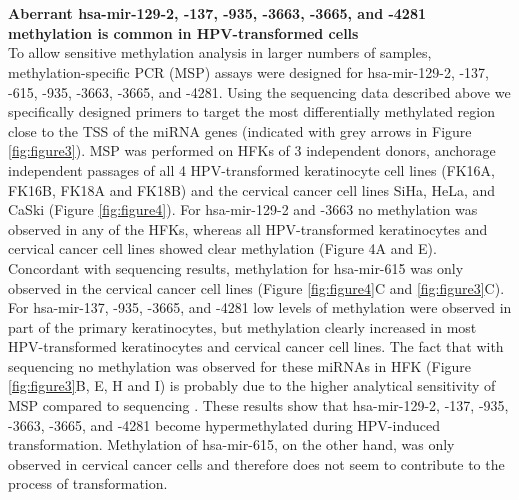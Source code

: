 \\
\\
\textbf{Aberrant hsa-mir-129-2, -137, -935, -3663, -3665, and -4281 methylation is common in HPV-transformed cells}
\\
To allow sensitive methylation analysis in larger numbers of samples, methylation-specific PCR (MSP) assays were designed for hsa-mir-129-2, -137, -615, -935, -3663, -3665, and -4281. Using the sequencing data described above we specifically designed primers to target the most differentially methylated region close to the TSS of the miRNA genes (indicated with grey arrows in Figure \ref{fig:figure3}). MSP was performed on HFKs of 3 independent donors, anchorage independent passages of all 4 HPV-transformed keratinocyte cell lines (FK16A, FK16B, FK18A and FK18B) and the cervical cancer cell lines SiHa, HeLa, and CaSki (Figure \ref{fig:figure4}). For hsa-mir-129-2 and -3663 no methylation was observed in any of the HFKs, whereas all HPV-transformed keratinocytes and cervical cancer cell lines showed clear methylation (Figure 4A and E). Concordant with sequencing results, methylation for hsa-mir-615 was only observed in the cervical cancer cell lines (Figure \ref{fig:figure4}C and \ref{fig:figure3}C). For hsa-mir-137, -935, -3665, and -4281 low levels of methylation were observed in part of the primary keratinocytes, but methylation clearly increased in most HPV-transformed keratinocytes and cervical cancer cell lines. The fact that with sequencing no methylation was observed for these miRNAs in HFK (Figure \ref{fig:figure3}B, E, H and I) is probably due to the higher analytical sensitivity of MSP compared to sequencing \cite{Eads2000, Kristensen2009}.  These results show that hsa-mir-129-2, -137, -935, -3663, -3665, and -4281 become hypermethylated during HPV-induced transformation. Methylation of hsa-mir-615, on the other hand, was only observed in cervical cancer cells and therefore does not seem to contribute to the process of transformation.
